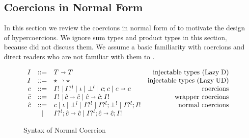 \documentclass[acmsmall,review,anonymous]{acmart}\settopmatter{printfolios=true,printccs=false,printacmref=false}
\newcommand{\stxrule}[3]{#1 & ::= & #3 & \text{#2}\\}
\newcommand{\stxrulecont}[1]{& | & #1 & \\}
\newcommand{\plus}[0]{+}
\newcommand{\lazyUD}{Lazy\;UD}
\newcommand{\lazyD}{Lazy\;D}
\newcommand{\TOOdyn}[0]{\star}
\newcommand{\POOfun}[2]{#1 \shortrightarrow #2}
\newcommand{\POOprod}[2]{#1 \times #2}
\newcommand{\POOsum}[2]{#1 \plus #2}
\newcommand{\ncProj}[2]{#1?^{#2}}
\newcommand{\ncInj}[1]{#1!}
\newcommand{\ncId}[0]{\iota}
\newcommand{\ncSeq}[2]{#1;#2}
\newcommand{\ncFail}[1]{\bot^{#1}}
\newcommand{\ncFun}[2]{\POOfun{#1}{#2}}
\newcommand{\ncProd}[2]{\POOprod{#1}{#2}}
\newcommand{\ncSum}[2]{\POOsum{#1}{#2}}
\begin{document}
\clearpage
\pagebreak

\subsection{Coercions in Normal Form} 
\label{sec:coercion-calculus}

In this section we review the coercions in normal form of
\citet{siek2012interpretations} to motivate the design of
hypercoercions.  We ignore sum types and product types in this
section, because \citet{siek2012interpretations} did not discuss
them. We assume a basic familiarity with coercions and direct readers
who are not familiar with them to \citet{siek2012interpretations}.

\begin{figure}
	\[
	\begin{array}{rclr}
	\stxrule{I}{injectable types (\lazyD)}{
		\POOfun{T}{T}}
	\stxrule{I}{injectable types (\lazyUD)}{
		\POOfun{\TOOdyn}{\TOOdyn}
	}
	\stxrule{c}{coercions}{
		\ncInj{I} \mid
		\ncProj{I}{l} \mid
		\ncId \mid
		\ncFail{l} \mid
		\ncSeq{c}{c} \mid
		\ncFun{c}{c}
	}
	\stxrule{\bar{c}}{wrapper coercions}{	
		\ncInj{I} \mid
		\ncFun{\hat{c}}{\hat{c}} \mid
		\ncSeq{\ncFun{\hat{c}}{\hat{c}}}{\ncInj{I}}
	}
	\stxrule{\hat{c}}{normal coercions}{
		\bar{c} \mid
		\ncId \mid
		\ncFail{l} \mid
		\ncProj{I}{l} \mid
		\ncSeq{\ncProj{I}{l}}{\ncFail{l}} \mid
		\ncSeq{\ncProj{I}{l}}{\ncInj{I}}
	}
	\stxrulecont{
		\ncSeq{\ncProj{I}{l}}{\ncFun{\hat{c}}{\hat{c}}} \mid
		\ncSeq{\ncProj{I}{l}}{\ncSeq{\ncFun{\hat{c}}{\hat{c}}}{\ncInj{I}}}
	}
	\end{array}
	\]
	\caption{Syntax of Normal Coercion}
	\label{fig:normal-coercion}
\end{figure}

\end{document}
